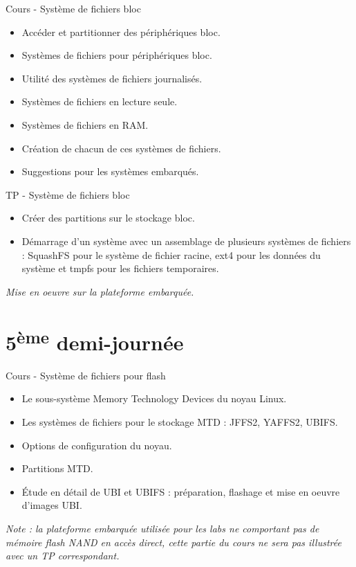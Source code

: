 \documentclass[a4paper,12pt,obeyspaces,spaces,hyphens]{article}
\begin{document}
\feagendatwocolumn
{Cours - Système de fichiers bloc}
{
  \begin{itemize}
  \item Accéder et partitionner des périphériques bloc.
  \item Systèmes de fichiers pour périphériques bloc.
  \item Utilité des systèmes de fichiers journalisés.
  \item Systèmes de fichiers en lecture seule.
  \item Systèmes de fichiers en RAM.
  \item Création de chacun de ces systèmes de fichiers.
  \item Suggestions pour les systèmes embarqués.
  \end{itemize}
}
{TP - Système de fichiers bloc}
{
  \begin{itemize}
  \item Créer des partitions sur le stockage bloc.
  \item Démarrage d'un système avec un assemblage de plusieurs systèmes
    de fichiers : SquashFS pour le système de fichier racine, ext4 pour
    les données du système et tmpfs pour les fichiers temporaires.
  \end{itemize}
  \vspace{0.5cm}
  {\em Mise en oeuvre sur la plateforme embarquée.}
}

\section{5\textsuperscript{ème} demi-journée}

\feagendaonecolumn
{Cours - Système de fichiers pour flash}
{
  \begin{itemize}
  \item Le sous-système Memory Technology Devices du noyau Linux.
  \item Les systèmes de fichiers pour le stockage MTD : JFFS2, YAFFS2,
    UBIFS.
  \item Options de configuration du noyau.
  \item Partitions MTD.
  \item Étude en détail de UBI et UBIFS : préparation, flashage et mise
    en oeuvre d'images UBI.
  \end{itemize}

  \vspace{0.5cm}

  {\em Note : la plateforme embarquée utilisée pour les labs ne
    comportant pas de mémoire flash NAND en accès direct, cette partie
    du cours ne sera pas illustrée avec un TP correspondant.}
}
\end{document}
